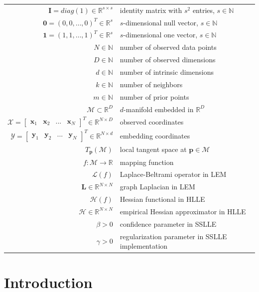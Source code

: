 \documentclass[12pt, t]{article}
\newcommand{\mani}{\mathcal{M}}
\newcommand{\N}{\mathbb{N}}
\newcommand{\R}{\mathbb{R}}
\newcommand{\RD}{\mathbb{R}^D}
\newcommand{\X}{\mathcal{X}}
\newcommand{\x}{\bm{x}}
\newcommand{\Y}{\mathcal{Y}}
\newcommand{\y}{\bm{y}}
\newcommand{\pv}{\bm{p}}
\newcommand{\I}{\bm{I}}
\newcommand{\Lap}{\bm{L}}
\begin{document}
\begin{tabular}{rl}
  $\I = \mathit{diag}(1) \in \R^{s \times s}$ & identity matrix with $s^2$ 
  entries, $s \in \N$ \\
  $\bm{0} = (0, 0, \dots, 0)^T \in \R^s$ & $s$-dimensional null vector, 
  $s \in \N$ \\
  $\bm{1} = (1, 1, \dots, 1)^T \in \R^s$ & $s$-dimensional one vector, 
  $s \in \N$ \\
  $N \in \N$ & number of observed data points \\
  $D \in \N$ & number of observed dimensions \\
  $d \in \N$ & number of intrinsic dimensions\\
  $k \in \N$ & number of neighbors \\
  $m \in \N$ & number of prior points \\
  $\mani \subset \RD$ & $d$-manifold embedded in $\RD$ \\
  $\X = \begin{bmatrix} \x_1 & \x_2 & ... & \x_N \end{bmatrix}^T 
  \in \R^{N \times D}$ & observed coordinates \\
  $\Y = \begin{bmatrix} \y_1 & \y_2 & ... & \y_N \end{bmatrix}^T 
  \in \R^{N \times d}$ & embedding coordinates \\
  $T_{\pv}(\mani)$ & local tangent space at $\pv \in \mani$ \\
  $f: \mani \rightarrow \R$ & mapping function \\
  $\mathcal{L}(f)$ & Laplace-Beltrami operator in LEM \\
  $\Lap\in \R^{N \times N}$ & graph Laplacian in LEM \\
  $\mathscr{H}(f)$ & Hessian functional in HLLE \\
  $\mathcal{H} \in \R^{N \times N}$ & empirical Hessian approximator in HLLE \\
  $\beta > 0$ & confidence parameter in SSLLE \\
  $\gamma > 0$ & regularization parameter in SSLLE implementation
\end{tabular}

\newpage


    
\section{Introduction}
\label{intro}

\end{document}
